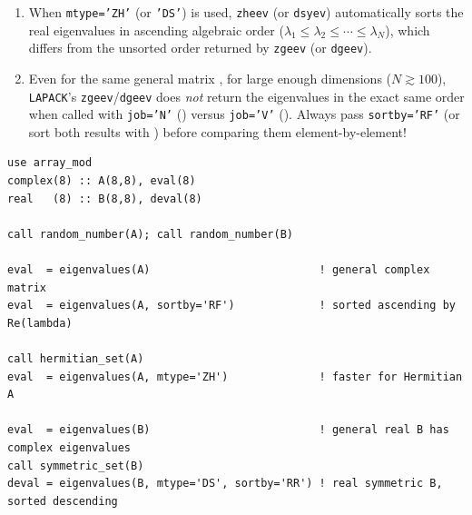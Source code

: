 \begin{warnbox}
\begin{enumerate}
  \item When \texttt{mtype='ZH'} (or \texttt{'DS'}) is used, \texttt{zheev} (or \texttt{dsyev}) automatically sorts the real eigenvalues in ascending algebraic order ($\lambda_1 \le \lambda_2 \le \cdots \le \lambda_N$), which differs from the unsorted order returned by \texttt{zgeev} (or \texttt{dgeev}).
  \item Even for the same general matrix , for large enough dimensions ($N \gtrsim 100$), \texttt{LAPACK}'s \texttt{zgeev}/\texttt{dgeev} does \emph{not} return the eigenvalues in the exact same order when called with \texttt{job='N'} () versus \texttt{job='V'} (). Always pass \texttt{sortby='RF'} (or sort both results with ) before comparing them element-by-element!
\end{enumerate}
\end{warnbox}

\begin{description}[leftmargin=2.2cm, style=nextline]
\end{description}

\lstset{language=[95]Fortran}
\begin{lstlisting}
use array_mod
complex(8) :: A(8,8), eval(8)
real   (8) :: B(8,8), deval(8)

call random_number(A); call random_number(B)

eval  = eigenvalues(A)                          ! general complex matrix
eval  = eigenvalues(A, sortby='RF')             ! sorted ascending by Re(lambda)

call hermitian_set(A)
eval  = eigenvalues(A, mtype='ZH')              ! faster for Hermitian A

eval  = eigenvalues(B)                          ! general real B has complex eigenvalues
call symmetric_set(B)
deval = eigenvalues(B, mtype='DS', sortby='RR') ! real symmetric B, sorted descending
\end{lstlisting}

